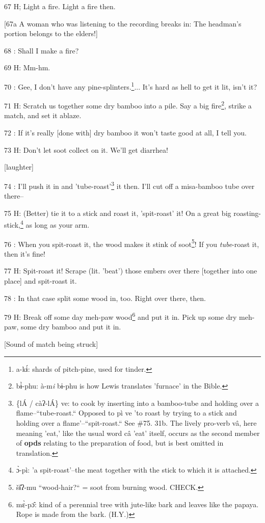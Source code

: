 67 H; Light a fire. Light a fire then.

[67a A woman who was listening to the recording breaks in: The headman's portion
belongs to the elders!]

68  : Shall I make a fire?

69 H: Mm-hm.

70  : Gee, I don't have any pine-splinters.\footnote{a-kɨ́: shards of pitch-pine, used for tinder.}... It's hard as hell to get it
lit, isn't it?

71 H: Scratch us together some dry bamboo into a pile. Say a big fire\footnote{bɨ̀-phu: à-m\emph{i} bɨ-phu is how Lewis translates 'furnace' in the Bible.}, strike
a match, and set it ablaze.

72  : If it's really [done with] dry bamboo it won't taste good at all, I tell
you.

73 H: Don't let soot collect on it. We'll get diarrhea!

[laughter]

74  : I'll push it in and 'tube-roast'\footnote{\{lÁ / càʔ-lÁ\} ve: to cook by inserting into a bamboo-tube and holding over a flame--``tube-roast.`` Opposed to pì ve 'to roast by trying to a stick and holding over a flame'--``spit-roast.`` See \#75.  31b. The lively pro-verb vâ, here meaning 'eat,' like the usual word câ 'eat' itself, occurs as the second member of \textbf{opds} relating to the preparation of food, but is best omitted in translation.} it then. I'll cut off a misa-bamboo
tube over there--

75 H: (Better) tie it to a stick and roast it, 'spit-roast' it! On a great big
roasting-stick,\footnote{ɔ̀-pì: 'a spit-roast'--the meat together with the stick to which it is attached.} as long as your arm.

76  : When you spit-roast it, the wood makes it stink of soot\footnote{šɨ̂ʔ-mu ``wood-hair?`` = soot from burning wood. CHECK.}! If you \emph{tube}-roast
it, then it's fine!

77 H: Spit-roast it! Scrape (lit. 'beat') those embers over there [together into
one place] and spit-roast it.

78  : In that case split some wood in, too. Right over there, then.

79 H: Break off some day meh-paw wood\footnote{mɛ̀-pɔ̂: kind of a perennial tree with jute-like bark and leaves like the papaya. Rope is made from the bark. (H.Y.)} and put it in. Pick up some dry meh-paw,
some dry bamboo and put it in.

[Sound of match being struck]

